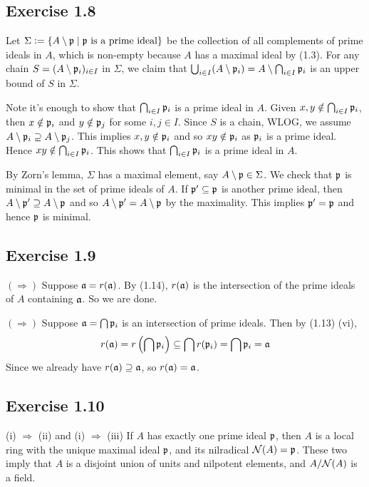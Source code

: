 \documentclass[../A&M.tex]{subfiles}
\begin{document}
\subsection*{Exercise 1.8}

Let $\Sigma:=\{A\setminus\mathfrak{p} \mid \mathfrak{p} \text{ is a prime ideal}\}$ be the collection of all complements of prime ideals in $A$, which is non-empty because $A$ has a maximal ideal by (1.3). For any chain $S=(A\setminus\mathfrak{p}_i)_{i\in I}$ in $\Sigma$, we claim that $\bigcup_{i\in I} (A\setminus\mathfrak{p}_i) = A\setminus \bigcap_{i\in I} \mathfrak{p}_i$ is an upper bound of $S$ in $\Sigma$.

Note it's enough to show that $\bigcap_{i\in I} \mathfrak{p}_i$ is a prime ideal in $A$. Given $x,y \notin \bigcap_{i\in I} \mathfrak{p}_i$, then $x\notin \mathfrak{p}_i$ and $y\notin\mathfrak{p}_j$ for some $i,j\in I$. Since $S$ is a chain, WLOG, we assume $A\setminus\mathfrak{p}_i \supseteq A\setminus\mathfrak{p}_j$. This implies $x,y\notin \mathfrak{p}_i$ and so $xy\notin\mathfrak{p}_i$ as $\mathfrak{p}_i$ is a prime ideal. Hence $xy\notin \bigcap_{i\in I} \mathfrak{p}_i$. This shows that $\bigcap_{i\in I} \mathfrak{p}_i$ is a prime ideal in $A$.

By Zorn's lemma, $\Sigma$ has a maximal element, say $A\setminus\mathfrak{p} \in \Sigma$. We check that $\mathfrak{p}$ is minimal in the set of prime ideals of $A$. If $\mathfrak{p}' \subseteq \mathfrak{p}$ is another prime ideal, then $A\setminus\mathfrak{p}' \supseteq A\setminus\mathfrak{p}$ and so $A\setminus\mathfrak{p}' = A\setminus\mathfrak{p}$ by the maximality. This implies $\mathfrak{p}'=\mathfrak{p}$ and hence $\mathfrak{p}$ is minimal.

\subsection*{Exercise 1.9}

$(\Rightarrow)$ Suppose $\mathfrak{a}=r(\mathfrak{a})$. By (1.14), $r(\mathfrak{a})$ is the intersection of the prime ideals of $A$ containing $\mathfrak{a}$. So we are done.

$(\Rightarrow)$ Suppose $\mathfrak{a}=\bigcap \mathfrak{p}_i$ is an intersection of prime ideals. Then by (1.13) (vi),
$$
r(\mathfrak{a}) = r\left( \bigcap \mathfrak{p}_i \right) \subseteq \bigcap r(\mathfrak{p}_i) = \bigcap \mathfrak{p}_i = \mathfrak{a}
$$
Since we already have $r(\mathfrak{a})\supseteq\mathfrak{a}$, so $r(\mathfrak{a})=\mathfrak{a}$.

\subsection*{Exercise 1.10}

(i) $\Rightarrow$ (ii) and (i) $\Rightarrow$ (iii) If $A$ has exactly one prime ideal $\mathfrak{p}$, then $A$ is a local ring with the unique maximal ideal $\mathfrak{p}$, and its nilradical $\mathcal{N}(A)=\mathfrak{p}$. These two imply that $A$ is a disjoint union of units and nilpotent elements, and $A/\mathcal{N}(A)$ is a field.
\end{document}
